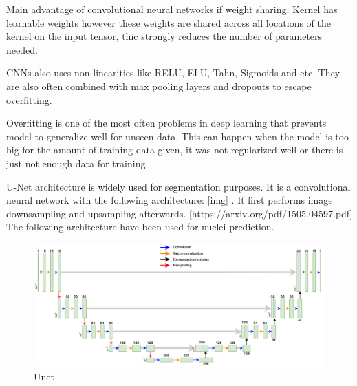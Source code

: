 Main advantage of convolutional neural networks if weight sharing. Kernel has learnable weights however these weights are shared across all locations of the kernel on the input tensor, thic strongly reduces the number of parameters needed.

CNNs also uses non-linearities like RELU, ELU, Tahn, Sigmoids and etc. They are also often combined with max pooling layers and dropouts to escape overfitting. 

Overfitting is one of the most often problems in deep learning that prevents model to generalize well for unseen data. This can happen when the model is too big for the amount of training data given, it was not regularized well or there is just not enough data for training. 

U-Net architecture is widely used for segmentation purposes. It is a convolutional neural network with the following architecture: [img] . It first performs image downsampling and upsampling afterwards.
[https://arxiv.org/pdf/1505.04597.pdf] The following architecture have been used for nuclei prediction. 
\begin{figure}[htb]
	\begin{center}
		\includegraphics[width=\linewidth]{bilder/Unet.png}
		\caption{Unet}\label{fig:unet}
	\end{center}
\end{figure}
